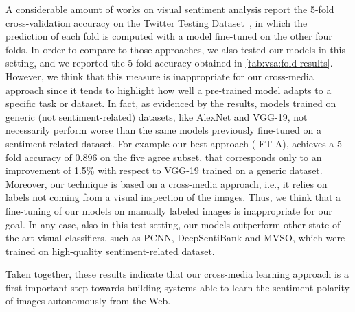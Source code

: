 A considerable amount of works on visual sentiment analysis report the 5-fold cross-validation accuracy on the Twitter Testing Dataset~\cite{campos2017pixels,islam2016visual,li2018image,you2015robust}, in which the prediction of each fold is computed with a model fine-tuned on the other four folds.
In order to compare to those approaches, we also tested our models in this setting, and we reported the 5-fold accuracy obtained in \ref{tab:vsa:fold-results}.
However, we think that this measure is inappropriate for our cross-media approach since it tends to highlight how well a pre-trained model adapts to a specific task or dataset.
In fact, as evidenced by the results, models trained on generic (not sentiment-related) datasets, like AlexNet and VGG-19, not necessarily perform worse than the same models previously fine-tuned on a sentiment-related dataset.
For example our best approach ({\ourFtVGG} FT-A), achieves a 5-fold accuracy of 0.896 on the five agree subset, that corresponds only to an improvement of 1.5\% with respect to VGG-19 trained on a generic dataset.
Moreover, our technique is based on a cross-media approach, i.e., it relies on labels not coming from a visual inspection of the images.
Thus, we think that a fine-tuning of our models on manually labeled images is inappropriate for our goal.
In any case, also in this test setting, our models outperform other state-of-the-art visual classifiers, such as PCNN, DeepSentiBank and MVSO, which were trained on high-quality sentiment-related dataset.

Taken together, these results indicate that our cross-media learning approach is a first important step towards building systems able to learn the sentiment polarity of images autonomously from the Web.


